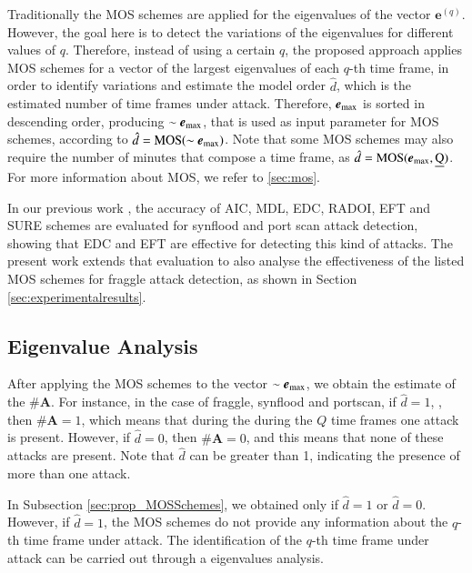 \documentclass[review]{elsarticle}
\begin{document}
Traditionally the MOS schemes are applied for the eigenvalues of the vector $\boldsymbol{e}^{(q)}$. However, the goal here is to detect the variations of the eigenvalues for different values of $q$. Therefore, instead of using a certain $q$, the proposed approach applies MOS schemes for a vector of the largest eigenvalues of each $q$-th time frame, in order to identify variations and estimate the model order $\hat{d}$, which is the estimated number of time frames under attack. Therefore, $\boldsymbol{e}_{\rm max}$ is sorted in descending order, producing $\sim\boldsymbol{e}_{\rm max}$, that is used as input parameter for MOS schemes, according to $\hat{d} = \rm{MOS}(\sim\boldsymbol{e}_{\rm max})$. Note that some MOS schemes may also require the number of minutes that compose a time frame, as $\hat{d} = \rm{MOS}(\boldsymbol{e}_{\rm max},\emph{Q})$. For more information about MOS, we refer to \ref{sec:mos}.

In our previous work \cite{tenorio2013greatest}, the accuracy of AIC, MDL, EDC, RADOI, EFT and SURE schemes are evaluated for synflood and port scan attack detection, showing that EDC and EFT are effective for detecting this kind of attacks. The present work extends that evaluation to also analyse the effectiveness of the listed MOS schemes for fraggle attack detection, as shown in Section \ref{sec:experimentalresults}.

\subsection{Eigenvalue Analysis}
\label{sec:prop_EigenvalueAnalysis}

After applying the MOS schemes to the vector $\sim\boldsymbol{e}_{\rm max}$, we obtain the estimate of the $\#\boldsymbol{A}$. For instance, in the case of fraggle, synflood and portscan, if $\hat{d} = 1$, , then $\#\boldsymbol{A} = 1$, which means that during the during the $Q$ time frames one attack is present. However, if $\hat{d} = 0$, then $\#\boldsymbol{A} = 0$, and this means that none of these attacks are present. Note that $\hat{d}$ can be greater than 1, indicating the presence of more than one attack.

In Subsection \ref{sec:prop_MOSSchemes}, we obtained only if $\hat{d} = 1$ or $\hat{d} = 0$. However, if $\hat{d} = 1$, the MOS schemes do not provide any information about the $q$-th time frame under attack. The identification of the $q$-th time frame under attack can be carried out through a eigenvalues analysis.
\end{document}
